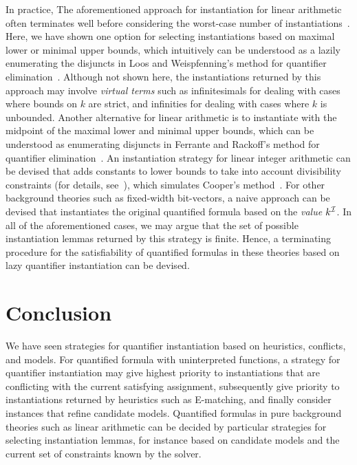 \documentclass[oribibl]{llncs}
\begin{document}
In practice,
The aforementioned approach for instantiation for linear arithmetic often terminates well before considering the worst-case number of instantiations~\cite{DBLP:conf/lpar/BjornerJ15,InstLA2016}.
Here, we have shown one option for selecting instantiations based on maximal lower or minimal upper bounds,
which intuitively can be understood as a lazily enumerating the disjuncts in Loos and Weispfenning's method for quantifier elimination~\cite{Loos93applyinglinear}.
Although not shown here, the instantiations returned by this approach may involve \emph{virtual terms} such as infinitesimals for dealing with cases where bounds on $k$ are strict,
and infinities for dealing with cases where $k$ is unbounded.
Another alternative for linear arithmetic is to instantiate with the midpoint of the
maximal lower and minimal upper bounds,
which can be understood as enumerating disjuncts in Ferrante and Rackoff's method for quantifier elimination~\cite{FerranteRackoff79ComputationalComplexityLogicalTheories}.
An instantiation strategy for linear integer arithmetic can be devised that adds constants to lower bounds to take into account divisibility constraints (for details, see~\cite{InstLA2016}),
which simulates Cooper's method~\cite{cooper1972}.
For other background theories such as fixed-width bit-vectors, 
a naive approach can be devised that instantiates the original quantified formula based on the \emph{value} $k^{\mathcal{I}}$.
In all of the aforementioned cases, we may argue that the set of possible instantiation lemmas returned by this strategy is finite.
Hence, a terminating procedure for the satisfiability of quantified formulas in these theories based on lazy quantifier instantiation can be devised.


\section{Conclusion}
\label{sec:conclusion}

We have seen strategies for quantifier instantiation
based on heuristics, conflicts, and models.
For quantified formula with uninterpreted functions,
a strategy for quantifier instantiation may give highest priority to instantiations that
are conflicting with the current satisfying assignment,
subsequently give priority to instantiations returned by heuristics such as E-matching,
and finally consider instances that refine candidate models.
Quantified formulas in pure background theories such as linear arithmetic can be 
decided by particular strategies for selecting instantiation lemmas, for instance
based on candidate models and the current set of constraints known by the solver.
\end{document}

